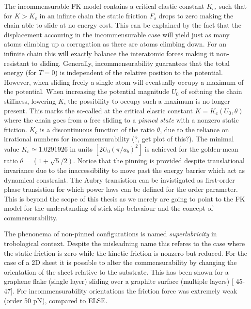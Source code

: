 The incommensurable FK model contains a critical elastic constant $K_c$, such
that for $K > K_c$ in an infinte chain the static friction $F_s$ drops to
zero making the chain able to slide at no energy cost. This can be
explained by the fact that the displacement accouring in the incommensurable
case will yield just as many atoms climbing up a corrugation as there are atoms climbing down. For an infinite chain this will exactly balance the interatomic forces making it non-resistant to sliding. Generally, incommensurability
guarantees that the total energy (for $T=0$) is independent of the relative
position to the potential. However, when sliding freely a single atom will
eventually occupy a maximum of the potential. When increasing the potential
magnitude $U_0$ of softning the chain stiffness, lowering $K$, the possibility to occupy such a maximum is no longer present. This marks the so-called  at the critical elasric constant $K = K_c(U_0, \theta)$ where the chain goes from a free sliding to a \textit{pinned state} with a nonzero static friction. $K_c$ is a discontinuous function of the ratio $\theta$, due to the reliance on irrational numbers for incommensurability (?, get plot of this?). The minimal value $K_c \simeq 1.0291926 $ in units $[2 U_0 (\pi / a_b)^2]$ is achieved for the golden-mean
ratio $\theta = (1+\sqrt{5}/2)$. Notice that the pinning is provided despite translational invariance due to the inaccessibility to move past the energy barrier which act as dynamical constraint. The Aubry transistion can be invistigated as first-order phase transistion for which power laws can be defined for the order parameter. This is beyond the scope of this thesis as we merely are going to point to the FK model for the understanding of stick-slip behvaiour and the concept of commensurability.

The phenonema of non-pinned configurations is named \textit{superlubricity} in trobological context. Despite the misleadning name this referes to the case where the static friction is zero while the kinetic friction is nonzero but reduced. For the case of a 2D sheet it is possible to alter the commensurability by changing the orientation of the sheet relative to the substrate. This has been shown for a graphene flake (single layer) sliding over a graphite surface (multiple layers) [\cite{Manini_2016} 45-47]. For incommensurability orientations the friction force was extremely weak (order 50 pN), compared to ELSE. 

%
%
%
%
%


